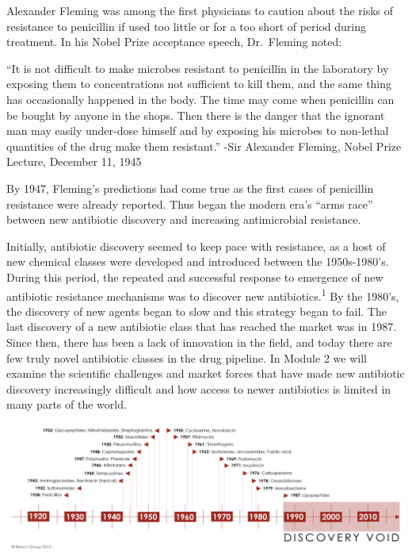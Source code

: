 \documentclass[
  11pt,
  paper=a4,
  ,captions=tableheading
]{scrartcl}
\renewenvironment{quote}{\begin{customblockquote}\list{}{\rightmargin=0em\leftmargin=0em}%
\item\relax\color{blockquote-text}\ignorespaces}{\unskip\unskip\endlist\end{customblockquote}}
\begin{document}
Alexander Fleming was among the first physicians to caution about the
risks of resistance to penicillin if used too little or for a too short
of period during treatment. In his Nobel Prize acceptance speech,
Dr.~Fleming noted:

\begin{quote}
``It is not difficult to make microbes resistant to penicillin in the
laboratory by exposing them to concentrations not sufficient to kill
them, and the same thing has occasionally happened in the body. The time
may come when penicillin can be bought by anyone in the shops. Then
there is the danger that the ignorant man may easily under-dose himself
and by exposing his microbes to non-lethal quantities of the drug make
them resistant.'' -Sir Alexander Fleming, Nobel Prize Lecture, December
11, 1945
\end{quote}

By 1947, Fleming's predictions had come true as the first cases of
penicillin resistance were already reported. Thus began the modern era's
``arms race'' between new antibiotic discovery and increasing
antimicrobial resistance.

Initially, antibiotic discovery seemed to keep pace with resistance, as
a host of new chemical classes were developed and introduced between the
1950s-1980's. During this period, the repeated and successful response
to emergence of new antibiotic resistance mechanisms was to discover new
antibiotics.\textsuperscript{1} By the 1980's, the discovery of new
agents began to slow and this strategy began to fail. The last discovery
of a new antibiotic class that has reached the market was in 1987. Since
then, there has been a lack of innovation in the field, and today there
are few truly novel antibiotic classes in the drug pipeline. In Module 2
we will examine the scientific challenges and market forces that have
made new antibiotic discovery increasingly difficult and how access to
newer antibiotics is limited in many parts of the world.

\includegraphics[width=6.25in,height=\textheight]{images/ab-discovery-timeline.png}
\end{document}
